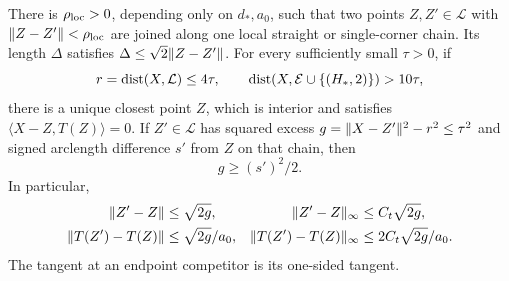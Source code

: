 \begin{lemma}\label{geo:projection}
There is $\rho_{\rm loc}>0$, depending only on $d_*,a_0$, such that
two points $Z,Z'\in\mathcal L$ with $\lVert Z-Z'\rVert<\rho_{\rm loc}$
are joined along one local straight or single-corner chain. Its length
$\Delta$ satisfies $\Delta\le\sqrt2\lVert Z-Z'\rVert$.
For every sufficiently small $\tau>0$, if
\begin{equation}\label{geo:tube-hypothesis}
 r=\operatorname{dist}(X,\mathcal L)\le4\tau,\qquad
 \operatorname{dist}(X,\mathcal E\cup\{(H_*,2)\})>10\tau,
\end{equation}
there is a unique closest point $Z$, which is interior and satisfies
$\langle X-Z,T(Z)\rangle=0$. If $Z'\in\mathcal L$ has squared excess
$g=\lVert X-Z'\rVert^2-r^2\le\tau^2$ and signed arclength difference $s'$
from $Z$ on that chain, then
\begin{equation}\label{geo:strong-excess}
 g\ge (s')^2/2.
\end{equation}
In particular,
\begin{align}
 \lVert Z'-Z\rVert&\le\sqrt{2g},&
 \lVert Z'-Z\rVert_\infty&\le C_t\sqrt{2g},\label{geo:point-error}\\
 \lVert T(Z')-T(Z)\rVert&\le\sqrt{2g}/a_0,&
 \lVert T(Z')-T(Z)\rVert_\infty&\le2C_t\sqrt{2g}/a_0.
 \label{geo:tangent-error}
\end{align}
The tangent at an endpoint competitor is its one-sided tangent.
\end{lemma}
